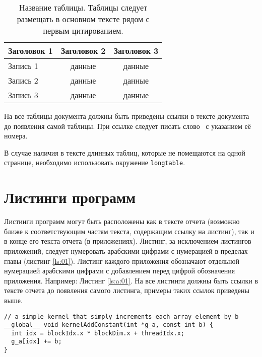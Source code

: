 \begin{table}[h]
\caption{Название таблицы. Таблицы следует размещать в основном тексте рядом с первым цитированием.}
\label{tab:1}
\begin{center}
\begin{tabular}{|l|c|c|}
\hline
Заголовок 1 & Заголовок 2 & Заголовок 3 \\
\hline
Запись 1 &данные &данные\\
\hline
Запись 2 &данные &данные\\
\hline
Запись 3 &данные &данные\\
\hline
\end{tabular}
\end{center}
\end{table}

На все таблицы документа должны быть приведены ссылки в тексте
документа до появления самой таблицы. При ссылке следует писать слово \guillemotright\ с указанием её номера.

В случае наличия в тексте длинных таблиц, которые не помещаются на одной странице, необходимо использовать окружение \verb|longtable|.

\section{Листинги программ}

Листинги программ могут быть расположены как в тексте отчета (возможно ближе к 
соответствующим частям текста, содержащим ссылку на листинг),  так и в конце его текста отчета (в приложениях). Листинг, за исключением листингов приложений, следует нумеровать арабскими цифрами с нумерацией в пределах главы (листинг \ref{ls:01}).
Листинг каждого приложения обозначают отдельной нумерацией арабскими цифрами с добавлением перед цифрой обозначения приложения. Например: Листинг \ref{ls:a:01}.
На все листинги должны быть ссылки в тексте отчета до появления самого листинга, примеры таких ссылок приведены выше.

\begin{lstlisting}[caption={Пример листинга в тексте}, label={ls:01}]
// a simple kernel that simply increments each array element by b
__global__ void kernelAddConstant(int *g_a, const int b) {
  int idx = blockIdx.x * blockDim.x + threadIdx.x;
  g_a[idx] += b;
}
\end{lstlisting}